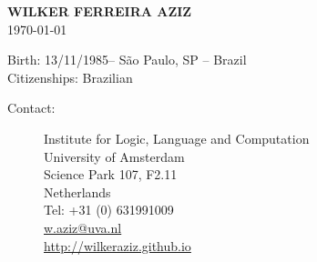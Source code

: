 \documentclass[10pt,a4paper,oneside]{article}
\makeatletter
\newcommand{\myname}{WILKER FERREIRA AZIZ\xspace}
\newcommand{\birthday}{13/11/1985\xspace}
\newcommand{\location}{S\~ao Paulo, SP -- Brazil\xspace}
\newcommand{\citizenships}{Brazilian\xspace}
\newcommand{\contact}{Institute for Logic, Language and Computation \\
University of Amsterdam \\
Science Park 107, F2.11 \\
Netherlands  \\
Tel: +31 (0) 631991009 \\
\url{w.aziz@uva.nl} \\
\url{http://wilkeraziz.github.io} 
}
\makeatother
\begin{document}




\begin{center}
{\large \bf
\myname \\
}
{\small
\today \\
}
\end{center}

Birth: \birthday -- \location \\
Citizenships: \citizenships \\
\vspace{2mm}
\begin{description}
	\item[Contact:] \contact
\end{description}










\end{document}
